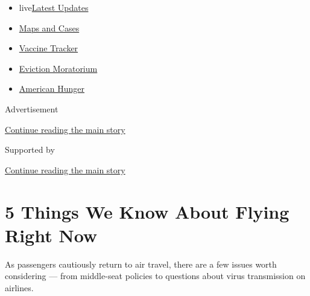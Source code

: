\begin{itemize}
\tightlist
\item
  live\href{https://www.nytimes3xbfgragh.onion/2020/09/08/world/covid-19-coronavirus.html?name=styln-coronavirus-national\&region=TOP_BANNER\&block=storyline_menu_recirc\&action=click\&pgtype=Article\&impression_id=0faeb3d0-f1df-11ea-98d7-2bcdd79e137a\&variant=undefined}{Latest
  Updates}
\item
  \href{https://www.nytimes3xbfgragh.onion/interactive/2020/us/coronavirus-us-cases.html?name=styln-coronavirus-national\&region=TOP_BANNER\&block=storyline_menu_recirc\&action=click\&pgtype=Article\&impression_id=0faeb3d1-f1df-11ea-98d7-2bcdd79e137a\&variant=undefined}{Maps
  and Cases}
\item
  \href{https://www.nytimes3xbfgragh.onion/interactive/2020/science/coronavirus-vaccine-tracker.html?name=styln-coronavirus-national\&region=TOP_BANNER\&block=storyline_menu_recirc\&action=click\&pgtype=Article\&impression_id=0faeb3d2-f1df-11ea-98d7-2bcdd79e137a\&variant=undefined}{Vaccine
  Tracker}
\item
  \href{https://www.nytimes3xbfgragh.onion/2020/09/02/your-money/eviction-moratorium-covid.html?name=styln-coronavirus-national\&region=TOP_BANNER\&block=storyline_menu_recirc\&action=click\&pgtype=Article\&impression_id=0faeb3d3-f1df-11ea-98d7-2bcdd79e137a\&variant=undefined}{Eviction
  Moratorium}
\item
  \href{https://www.nytimes3xbfgragh.onion/interactive/2020/09/02/magazine/food-insecurity-hunger-us.html?name=styln-coronavirus-national\&region=TOP_BANNER\&block=storyline_menu_recirc\&action=click\&pgtype=Article\&impression_id=0faeb3d4-f1df-11ea-98d7-2bcdd79e137a\&variant=undefined}{American
  Hunger}
\end{itemize}

Advertisement

\protect\hyperlink{after-top}{Continue reading the main story}

Supported by

\protect\hyperlink{after-sponsor}{Continue reading the main story}

\hypertarget{5-things-we-know-about-flying-right-now}{%
\section{5 Things We Know About Flying Right
Now}\label{5-things-we-know-about-flying-right-now}}

As passengers cautiously return to air travel, there are a few issues
worth considering --- from middle-seat policies to questions about virus
transmission on airlines.

